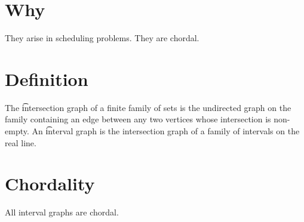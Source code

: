 

\section*{Why}

They arise in scheduling problems.
They are chordal.

\section*{Definition}

The \t{intersection graph} of a finite family of sets is the undirected graph on the family containing an edge between any two vertices whose intersection is non-empty.
An \t{interval graph} is the intersection graph of a family of intervals on the real line.

\section*{Chordality}

\begin{proposition}
All interval graphs are chordal.

\end{proposition}

